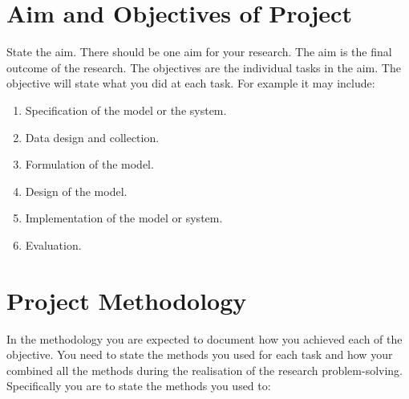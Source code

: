 \section{Aim and Objectives of Project}

State the aim. There should be one aim for your research. The aim is the final outcome of the research.  The objectives are the individual tasks in the aim.  The objective will state what you did at each task. For example it may include:

\begin{enumerate}
\item Specification of the model or the system. \vspace*{-4mm}
\item Data design and collection. \vspace*{-4mm}
\item Formulation of the model. \vspace*{-4mm}
\item Design of the model. \vspace*{-4mm}
\item Implementation of the model or system. \vspace*{-4mm}
\item Evaluation. 
\end{enumerate}

\section{Project Methodology}
In the methodology you are expected to document how you achieved each of the objective. You need to state the methods you used for each task and how your combined all the methods during the realisation of the research problem-solving. Specifically you are to state the methods you used to:
  
